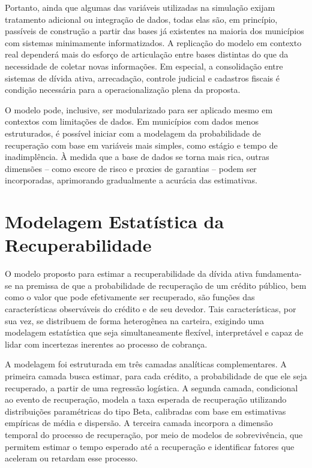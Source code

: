 \documentclass[a4paper,12pt]{article}
\begin{document}
Portanto, ainda que algumas das variáveis utilizadas na simulação exijam tratamento adicional ou integração de dados, todas elas são, em princípio, passíveis de construção a partir das bases já existentes na maioria dos municípios com sistemas minimamente informatizados. A replicação do modelo em contexto real dependerá mais do esforço de articulação entre bases distintas do que da necessidade de coletar novas informações. Em especial, a consolidação entre sistemas de dívida ativa, arrecadação, controle judicial e cadastros fiscais é condição necessária para a operacionalização plena da proposta.

O modelo pode, inclusive, ser modularizado para ser aplicado mesmo em contextos com limitações de dados. Em municípios com dados menos estruturados, é possível iniciar com a modelagem da probabilidade de recuperação com base em variáveis mais simples, como estágio e tempo de inadimplência. À medida que a base de dados se torna mais rica, outras dimensões – como escore de risco e proxies de garantias – podem ser incorporadas, aprimorando gradualmente a acurácia das estimativas.


\section{Modelagem Estatística da Recuperabilidade} 
O modelo proposto para estimar a recuperabilidade da dívida ativa fundamenta-se na premissa de que a probabilidade de recuperação de um crédito público, bem como o valor que pode efetivamente ser recuperado, são funções das características observáveis do crédito e de seu devedor. Tais características, por sua vez, se distribuem de forma heterogênea na carteira, exigindo uma modelagem estatística que seja simultaneamente flexível, interpretável e capaz de lidar com incertezas inerentes ao processo de cobrança.

A modelagem foi estruturada em três camadas analíticas complementares. A primeira camada busca estimar, para cada crédito, a probabilidade de que ele seja recuperado, a partir de uma regressão logística. A segunda camada, condicional ao evento de recuperação, modela a taxa esperada de recuperação utilizando distribuições paramétricas do tipo Beta, calibradas com base em estimativas empíricas de média e dispersão. A terceira camada incorpora a dimensão temporal do processo de recuperação, por meio de modelos de sobrevivência, que permitem estimar o tempo esperado até a recuperação e identificar fatores que aceleram ou retardam esse processo.
\end{document}
